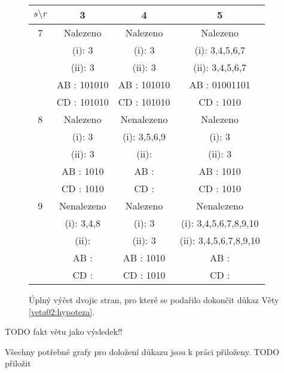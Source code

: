 \begin{figure}[h]\centering
\begin{tabular}{| c | c | c | c |}
\hline
{$s\setminus r$} & 3 &4&5 \\ \hline
 7 & \cellcolor{lightgray}Nalezeno & \cellcolor{lightgray}Nalezeno & \cellcolor{lightgray}Nalezeno\\
 & \cellcolor{lightgray}(i): 3 & \cellcolor{lightgray}(i): 3 & \cellcolor{lightgray}(i): 3,4,5,6,7\\
 & \cellcolor{lightgray}(ii): 3 & \cellcolor{lightgray}(ii): 3 & \cellcolor{lightgray}(ii): 3,4,5,6,7\\
 & \cellcolor{lightgray}AB : 101010 & \cellcolor{lightgray}AB : 101010 & \cellcolor{lightgray}AB : 01001101\\
 & \cellcolor{lightgray}CD : 101010 & \cellcolor{lightgray}CD : 101010 & \cellcolor{lightgray}CD : 1010\\\hline

8 & \cellcolor{lightgray}Nalezeno & Nenalezeno & \cellcolor{lightgray}Nalezeno\\
 & \cellcolor{lightgray}(i): 3 & (i): 3,5,6,9 & \cellcolor{lightgray}(i): 3\\
 & \cellcolor{lightgray}(ii): 3 & (ii):  & \cellcolor{lightgray}(ii): 3\\
 & \cellcolor{lightgray}AB : 1010 & AB :  & \cellcolor{lightgray}AB : 1010\\
 & \cellcolor{lightgray}CD : 1010 & CD :  & \cellcolor{lightgray}CD : 1010\\\hline

9 & Nenalezeno & \cellcolor{lightgray}Nalezeno & Nenalezeno\\
 & (i): 3,4,8 & \cellcolor{lightgray}(i): 3 & (i): 3,4,5,6,7,8,9,10\\
 & (ii):  & \cellcolor{lightgray}(ii): 3 & (ii): 3,4,5,6,7,8,9,10\\
 & AB :  & \cellcolor{lightgray}AB : 1010 & AB : \\
 & CD :  & \cellcolor{lightgray}CD : 1010 & CD : \\\hline



\end{tabular}
\caption{Úplný výčet dvojic stran, pro které se podařilo dokončit důkaz Věty \ref{veta02:hypoteza}.}
\label{obr03:tabvysledky}
\end{figure}

TODO fakt větu jako výsledek!!

Všechny potřebné grafy pro doložení důkazu jsou k práci přiloženy. TODO přiložit